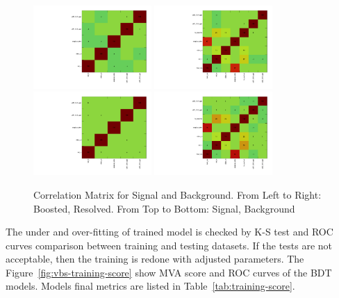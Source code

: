 \begin{figure}[!ht]
  \centering
  \includegraphics[width=0.4\textwidth]{analysis_plots/tmva_plots/zv_BDTG14_CorrelationMatrixS.pdf}
  \includegraphics[width=0.4\textwidth]{analysis_plots/tmva_plots/zjj_BDTG14_CorrelationMatrixS.pdf} \\
  \includegraphics[width=0.4\textwidth]{analysis_plots/tmva_plots/zv_BDTG14_CorrelationMatrixB.pdf}
  \includegraphics[width=0.4\textwidth]{analysis_plots/tmva_plots/zjj_BDTG14_CorrelationMatrixB.pdf} \\
  \caption[Correlation Matrix for Signal and Background]%
  {Correlation Matrix for Signal and Background. From Left to Right: Boosted, Resolved.
    From Top to Bottom: Signal, Background}%
  \label{fig:vbs-training-correlation}
\end{figure}

The under and over-fitting of trained model is checked by \gls{K-S} test
and \gls{ROC} curves comparison between training and testing datasets.
If the tests are not acceptable, then the training is redone with adjusted parameters.
The Figure~\ref{fig:vbs-training-score} show \gls{MVA} score and \gls{ROC} curves
of the BDT models. Models final metrics are listed in Table~\ref{tab:training-score}.

